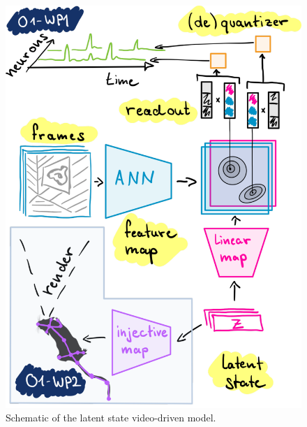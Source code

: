 \documentclass[B2,COG]{ercgrant}
\begin{document}
\begin{figure}
\includegraphics[width=\linewidth]{figures/model.pdf}
\caption{Schematic of the latent state video-driven model.\label{fig:model}}
\end{figure}
 
\end{document}
